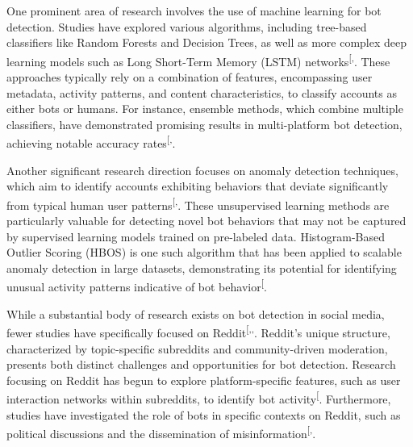 \documentclass[
  12pt,
  letterpaper,
  DIV=11,
  numbers=noendperiod]{scrartcl}
\begin{document}
One prominent area of research involves the use of machine learning for
bot detection. Studies have explored various algorithms, including
tree-based classifiers like Random Forests and Decision Trees, as well
as more complex deep learning models such as Long Short-Term Memory
(LSTM)
networks\textsuperscript{{[},\citeproc{ref-evalsocialbotmodels}{5}{]}}.
These approaches typically rely on a combination of features,
encompassing user metadata, activity patterns, and content
characteristics, to classify accounts as either bots or humans. For
instance, ensemble methods, which combine multiple classifiers, have
demonstrated promising results in multi-platform bot detection,
achieving notable accuracy
rates\textsuperscript{{[},\citeproc{ref-multibotdetector}{4}{]}}.

Another significant research direction focuses on anomaly detection
techniques, which aim to identify accounts exhibiting behaviors that
deviate significantly from typical human user
patterns\textsuperscript{{[},\citeproc{ref-anomalyf5networks}{7}{]}}.
These unsupervised learning methods are particularly valuable for
detecting novel bot behaviors that may not be captured by supervised
learning models trained on pre-labeled data. Histogram-Based Outlier
Scoring (HBOS) is one such algorithm that has been applied to scalable
anomaly detection in large datasets, demonstrating its potential for
identifying unusual activity patterns indicative of bot
behavior\textsuperscript{{[}\citeproc{ref-anomalycloudflare}{6}{]}}.

While a substantial body of research exists on bot detection in social
media, fewer studies have specifically focused on
Reddit\textsuperscript{{[},,\citeproc{ref-mlredditbots}{9}{]}}.
Reddit's unique structure, characterized by topic-specific subreddits
and community-driven moderation, presents both distinct challenges and
opportunities for bot detection. Research focusing on Reddit has begun
to explore platform-specific features, such as user interaction networks
within subreddits, to identify bot
activity\textsuperscript{{[}\citeproc{ref-redditbotnetwork}{8}{]}}.
Furthermore, studies have investigated the role of bots in specific
contexts on Reddit, such as political discussions and the dissemination
of
misinformation\textsuperscript{{[},\citeproc{ref-multibotdetector}{4}{]}}.
\end{document}
